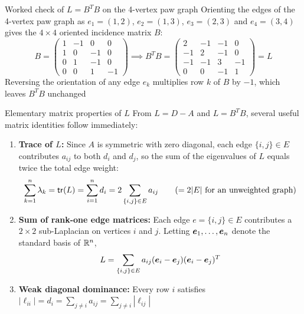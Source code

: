 \documentclass[aspectratio=169]{beamer}\usepackage[]{graphicx}\usepackage[]{xcolor}
\begin{document}
\begin{frame}{Worked check of $L = B^T B$ on the 4-vertex paw graph}
Orienting the edges of the 4-vertex paw graph as $e_1 = (1, 2)$, $e_2 = (1, 3)$, $e_3 = (2, 3)$ and $e_4 = (3, 4)$ gives the $4 \times 4$ oriented incidence matrix $B$:
\vfill
\[
B = \begin{pmatrix}
1 & -1 & 0 & 0 \\
1 & 0 & -1 & 0 \\
0 & 1 & -1 & 0 \\
0 & 0 & 1 & -1
\end{pmatrix}
\implies
B^T B = \begin{pmatrix}
2 & -1 & -1 & 0 \\
-1 & 2 & -1 & 0 \\
-1 & -1 & 3 & -1 \\
0 & 0 & -1 & 1
\end{pmatrix} = L
\]
\vfill
Reversing the orientation of any edge $e_k$ multiplies row $k$ of $B$ by $-1$, which leaves $B^T B$ unchanged
\end{frame}


\begin{frame}{Elementary matrix properties of $L$}
From $L = D - A$ and $L = B^T B$, several useful matrix identities follow immediately:
\vfill
\begin{enumerate}
\item \textbf{Trace of $L$:} Since $A$ is symmetric with zero diagonal, each edge $\{i, j\} \in E$ contributes $a_{ij}$ to both $d_i$ and $d_j$, so the sum of the eigenvalues of $L$ equals twice the total edge weight:
\[
\sum_{k=1}^n \lambda_k = \mathsf{tr}(L) = \sum_{i=1}^n d_i = 2 \sum_{\{i, j\} \in E} a_{ij} \qquad (= 2|E| \text{ for an unweighted graph})
\]
\item \textbf{Sum of rank-one edge matrices:} Each edge $e = \{i, j\} \in E$ contributes a $2\times 2$ sub-Laplacian on vertices $i$ and $j$. Letting $\bm{e}_1, \ldots, \bm{e}_n$ denote the standard basis of $\mathbb{R}^n$,
\[
L = \sum_{\{i, j\} \in E} a_{ij}(\bm{e}_i - \bm{e}_j)(\bm{e}_i - \bm{e}_j)^T
\]
\item \textbf{Weak diagonal dominance:} Every row $i$ satisfies $|\ell_{ii}| = d_i = \sum_{j \neq i} a_{ij} = \sum_{j \neq i} |\ell_{ij}|$
\end{enumerate}
\end{frame}


\end{document}
